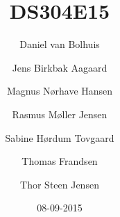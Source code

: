 

\title{DS304E15}
\author{Daniel van Bolhuis \and Jens Birkbak Aagaard \and Magnus Nørhave Hansen \and Rasmus Møller Jensen \and Sabine Hørdum Tovgaard\and Thomas Frandsen \and Thor Steen Jensen}
\date{08-09-2015}



\frontmatter

\maketitle





\tableofcontents

\mainmatter






















